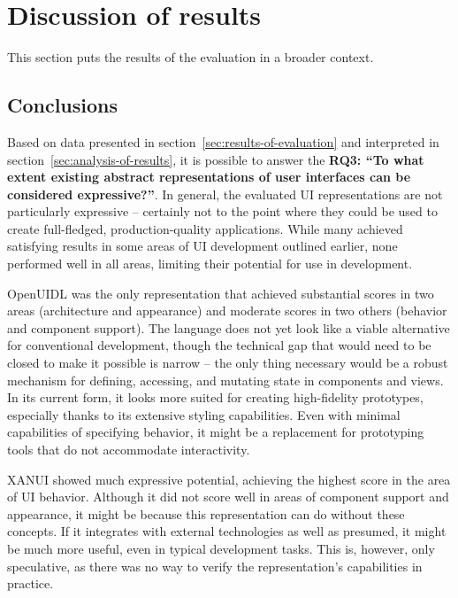\section{Discussion of results}\label{sec:evaluation-discussion-of-results}

This section puts the results of the evaluation in a broader context.

\subsection{Conclusions}\label{subsec:conclusions}

Based on data presented in section~\ref{sec:results-of-evaluation} and interpreted in section~\ref{sec:analysis-of-results}, it is possible to answer the \textbf{RQ3: \enquote{To what extent existing abstract representations of user interfaces can be considered expressive?}}.
In general, the evaluated UI representations are not particularly expressive -- certainly not to the point where they could be used to create full-fledged, production-quality applications.
While many achieved satisfying results in some areas of UI development outlined earlier, none performed well in all areas, limiting their potential for use in development.

OpenUIDL was the only representation that achieved substantial scores in two areas (architecture and appearance) and moderate scores in two others (behavior and component support).
The language does not yet look like a viable alternative for conventional development, though the technical gap that would need to be closed to make it possible is narrow -- the only thing necessary would be a robust mechanism for defining, accessing, and mutating state in components and views.
In its current form, it looks more suited for creating high-fidelity prototypes, especially thanks to its extensive styling capabilities.
Even with minimal capabilities of specifying behavior, it might be a replacement for prototyping tools that do not accommodate interactivity.

XANUI showed much expressive potential, achieving the highest score in the area of UI behavior.
Although it did not score well in areas of component support and appearance, it might be because this representation can do without these concepts.
If it integrates with external technologies as well as presumed, it might be much more useful, even in typical development tasks.
This is, however, only speculative, as there was no way to verify the representation's capabilities in practice.

